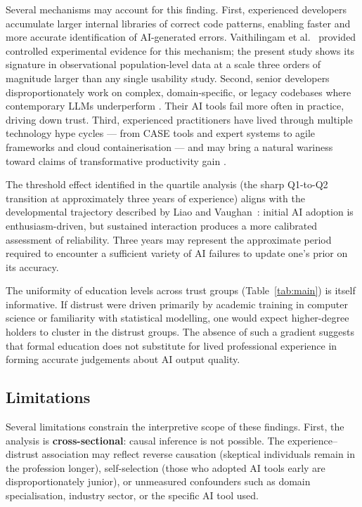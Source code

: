 \documentclass[11pt,a4paper]{article}
\begin{document}
Several mechanisms may account for this finding. First, experienced developers
accumulate larger internal libraries of correct code patterns, enabling faster and more
accurate identification of AI-generated errors. Vaithilingam et al.\
\cite{vaithilingam2022expectation} provided controlled experimental evidence for this
mechanism; the present study shows its signature in observational population-level data
at a scale three orders of magnitude larger than any single usability study. Second,
senior developers disproportionately work on complex, domain-specific, or legacy
codebases where contemporary LLMs underperform \cite{ziegler2022productivity}. Their
AI tools fail more often in practice, driving down trust. Third, experienced practitioners
have lived through multiple technology hype cycles --- from CASE tools and expert systems
to agile frameworks and cloud containerisation --- and may bring a natural wariness
toward claims of transformative productivity gain \cite{bird2022copilot}.

The threshold effect identified in the quartile analysis (the sharp Q1-to-Q2 transition
at approximately three years of experience) aligns with the developmental trajectory
described by Liao and Vaughan~\cite{liao2023transparency}: initial AI adoption is enthusiasm-driven, but
sustained interaction produces a more calibrated assessment of reliability. Three years
may represent the approximate period required to encounter a sufficient variety of AI
failures to update one's prior on its accuracy.

The uniformity of education levels across trust groups (Table~\ref{tab:main}) is itself
informative. If distrust were driven primarily by academic training in computer science
or familiarity with statistical modelling, one would expect higher-degree holders to
cluster in the distrust groups. The absence of such a gradient suggests that formal
education does not substitute for lived professional experience in forming accurate
judgements about AI output quality.

\subsection{Limitations}

Several limitations constrain the interpretive scope of these findings. First, the
analysis is \textbf{cross-sectional}: causal inference is not possible. The experience--distrust
association may reflect reverse causation (skeptical individuals remain in the profession
longer), self-selection (those who adopted AI tools early are disproportionately junior),
or unmeasured confounders such as domain specialisation, industry sector, or the specific
AI tool used.
\end{document}
